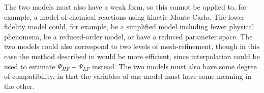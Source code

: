 The two models must also have a weak form, so this cannot be applied to, for example, a model of chemical reactions using kinetic Monte Carlo. The lower-fidelity model could, for example, be a simplified model including fewer physical phenomena, be a reduced-order model, or have a reduced parameter space. The two models could also correspond to two levels of mesh-refinement, though in this case the method described in \cite{BecVex05} would be more efficient, since interpolation could be used to estimate $\Psi_{HF}-\Psi_{LF}$ instead. The two models must also have some degree of compatibility, in that the variables of one model must have some meaning in the other. %







